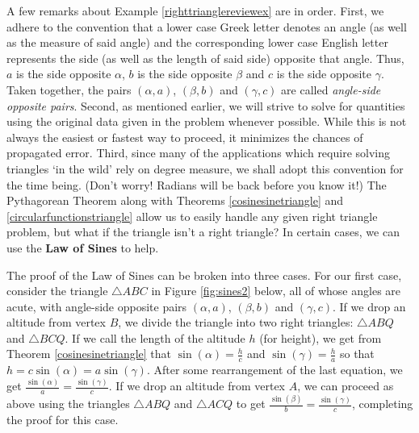 \medskip


A few remarks about Example \ref{righttrianglereviewex}  are in order.  First, we adhere to the convention that a lower case Greek letter denotes an angle (as well as the measure of said angle) and the corresponding lower case English letter represents the side (as well as the length of said side) opposite that angle.  Thus, $a$ is the side opposite $\alpha$, $b$ is the side opposite $\beta$ and $c$ is the side opposite $\gamma$.  Taken together, the pairs $(\alpha, a)$, $(\beta, b)$ and $(\gamma, c)$ are called  \textit{angle-side opposite pairs}.  Second, as mentioned earlier, we will strive to solve for quantities using the original data given in the problem whenever possible. While this is not always the easiest or fastest way to proceed, it minimizes the chances of propagated error.  Third, since many of the applications which require solving triangles `in the wild' rely on degree measure, we shall adopt this convention for the time being. (Don't worry!  Radians will be back before you know it!) The Pythagorean Theorem along with Theorems \ref{cosinesinetriangle} and \ref{circularfunctionstriangle} allow us to easily handle any given right triangle problem, but what if the triangle isn't a right triangle?  In certain cases, we can use the \textbf{Law of Sines} to help.

\smallskip


\smallskip

The proof of the Law of Sines can be broken into three cases. For our first case, consider the triangle $\triangle ABC$ in Figure \ref{fig:sines2} below, all of whose angles are acute, with angle-side opposite pairs $(\alpha, a)$, $(\beta, b)$ and $(\gamma, c)$.  If we drop an altitude from vertex $B$, we divide the triangle into two right triangles:  $\triangle ABQ$ and $\triangle BCQ$. If we call the length of the altitude $h$ (for height), we get from Theorem \ref{cosinesinetriangle} that $\sin(\alpha) = \frac{h}{c}$ and $\sin(\gamma) = \frac{h}{a}$ so that $h = c\sin(\alpha) = a \sin(\gamma)$.  After some rearrangement of the last equation, we get $\frac{\sin(\alpha)}{a} = \frac{\sin(\gamma)}{c}$. If we drop an altitude from vertex $A$, we can proceed as above using the triangles $\triangle ABQ$ and $\triangle ACQ$ to get $\frac{\sin(\beta)}{b} = \frac{\sin(\gamma)}{c}$, completing the proof for this case.


